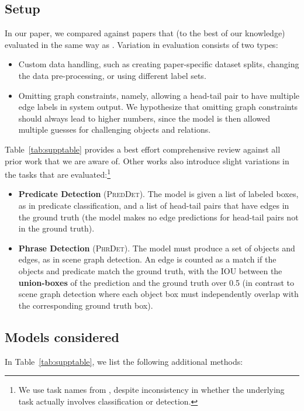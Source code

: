 \documentclass[10pt,twocolumn,letterpaper]{article}
\begin{document}
\subsection*{Setup}
In our paper, we compared against papers that (to the best of our knowledge) evaluated in the same way as \cite{xu_scene_2017}. 
Variation in evaluation consists of two types:
\begin{itemize}
    \item Custom data handling, such as creating paper-specific dataset splits, changing the data pre-processing, or using different label sets.
    \item Omitting graph constraints, namely, allowing a head-tail pair to have multiple edge labels in system output. We hypothesize that omitting graph constraints should always lead to higher numbers, since the model is then allowed multiple guesses for challenging objects and relations.
\end{itemize}
Table~\ref{tab:supptable} provides a best effort comprehensive review against all prior work that we are aware of. Other works also introduce slight variations in the tasks that are evaluated:\footnote{We use task names from \cite{lu_visual_2016}, despite inconsistency in whether the underlying task actually involves classification or detection.}\begin{itemize}
    \item \textbf{Predicate Detection} (\textsc{PredDet}). The model is given a list of labeled boxes, as in predicate classification, and a list of head-tail pairs that have edges in the ground truth (the model makes no edge predictions for head-tail pairs not in the ground truth).
    \item \textbf{Phrase Detection} (\textsc{PhrDet}). The model must produce a set of objects and edges, as in scene graph detection.  An edge is counted as a match if the objects and predicate match the ground truth, with the IOU between the {\bf union-boxes} of the prediction and the ground truth over 0.5 (in contrast to scene graph detection where each object box must independently overlap with the corresponding ground truth box). 
\end{itemize}\subsection*{Models considered}
In Table~\ref{tab:supptable}, we list the following additional methods:
\end{document}
